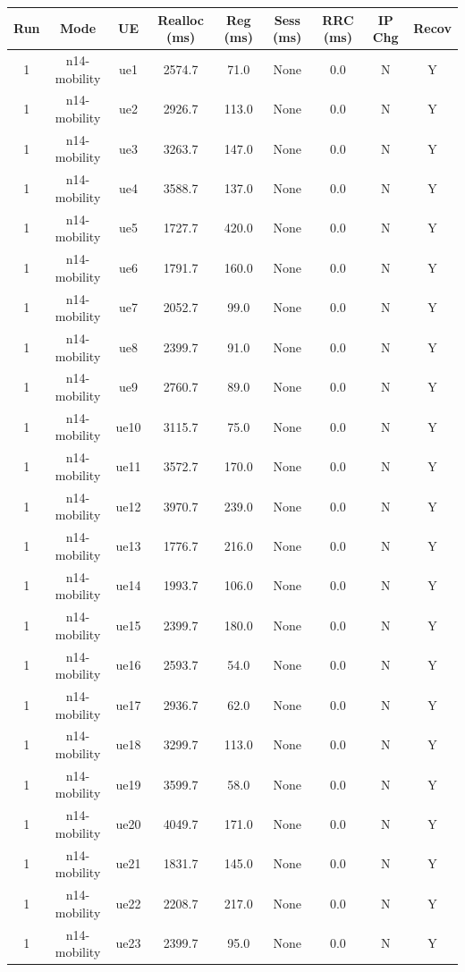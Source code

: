 \begin{table}[ht]
\centering
\begin{tabular}{|c|c|c|c|c|c|c|c|c|}
\hline
Run & Mode & UE & Realloc (ms) & Reg (ms) & Sess (ms) & RRC (ms) & IP Chg & Recov \\
\hline
1 & n14-mobility & ue1 & 2574.7 & 71.0 & None & 0.0 & N & Y \\
1 & n14-mobility & ue2 & 2926.7 & 113.0 & None & 0.0 & N & Y \\
1 & n14-mobility & ue3 & 3263.7 & 147.0 & None & 0.0 & N & Y \\
1 & n14-mobility & ue4 & 3588.7 & 137.0 & None & 0.0 & N & Y \\
1 & n14-mobility & ue5 & 1727.7 & 420.0 & None & 0.0 & N & Y \\
1 & n14-mobility & ue6 & 1791.7 & 160.0 & None & 0.0 & N & Y \\
1 & n14-mobility & ue7 & 2052.7 & 99.0 & None & 0.0 & N & Y \\
1 & n14-mobility & ue8 & 2399.7 & 91.0 & None & 0.0 & N & Y \\
1 & n14-mobility & ue9 & 2760.7 & 89.0 & None & 0.0 & N & Y \\
1 & n14-mobility & ue10 & 3115.7 & 75.0 & None & 0.0 & N & Y \\
1 & n14-mobility & ue11 & 3572.7 & 170.0 & None & 0.0 & N & Y \\
1 & n14-mobility & ue12 & 3970.7 & 239.0 & None & 0.0 & N & Y \\
1 & n14-mobility & ue13 & 1776.7 & 216.0 & None & 0.0 & N & Y \\
1 & n14-mobility & ue14 & 1993.7 & 106.0 & None & 0.0 & N & Y \\
1 & n14-mobility & ue15 & 2399.7 & 180.0 & None & 0.0 & N & Y \\
1 & n14-mobility & ue16 & 2593.7 & 54.0 & None & 0.0 & N & Y \\
1 & n14-mobility & ue17 & 2936.7 & 62.0 & None & 0.0 & N & Y \\
1 & n14-mobility & ue18 & 3299.7 & 113.0 & None & 0.0 & N & Y \\
1 & n14-mobility & ue19 & 3599.7 & 58.0 & None & 0.0 & N & Y \\
1 & n14-mobility & ue20 & 4049.7 & 171.0 & None & 0.0 & N & Y \\
1 & n14-mobility & ue21 & 1831.7 & 145.0 & None & 0.0 & N & Y \\
1 & n14-mobility & ue22 & 2208.7 & 217.0 & None & 0.0 & N & Y \\
1 & n14-mobility & ue23 & 2399.7 & 95.0 & None & 0.0 & N & Y \\

\end{tabular}
\end{table}
